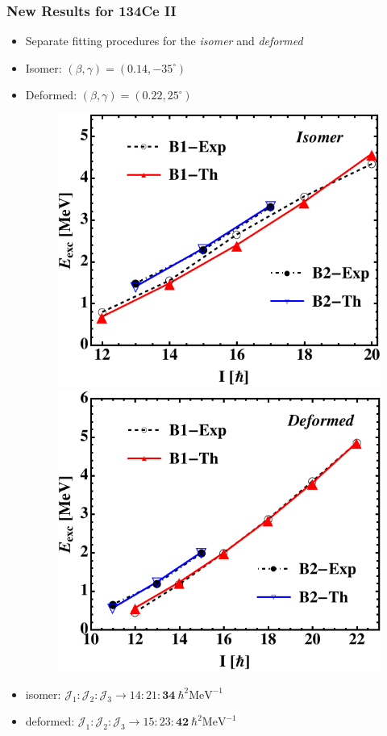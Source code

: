 \documentclass{beamer}
\begin{document}
\begin{frame}
  \frametitle{New Results for 134Ce II}
  \begin{itemize}
    \item Separate fitting procedures for the \emph{isomer} and \emph{deformed}
    \item Isomer: $(\beta,\gamma)=(0.14,-35^\circ)$
    \item Deformed: $(\beta,\gamma)=(0.22,25^\circ)$
    \begin{figure}
      \centering
      \includegraphics[scale=0.5]{Figs/134Ce-excitation-isomer.pdf}
      \includegraphics[scale=0.5]{Figs/134Ce-excitation-deformed.pdf}
    \end{figure}
    \item isomer: $\mathcal{J}_1:\mathcal{J}_2:\mathcal{J}_3\to 14:21:\mathbf{34}\ \hbar^2\text{MeV}^{-1}$ 
    \item deformed: $\mathcal{J}_1:\mathcal{J}_2:\mathcal{J}_3\to 15:23:\mathbf{42}\ \hbar^2\text{MeV}^{-1}$
  \end{itemize}
\end{frame}
\end{document}
